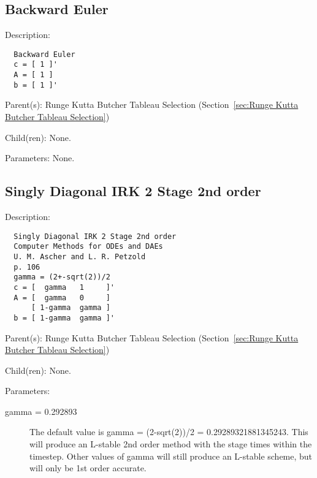 \subsection{Backward Euler}
\label{sec:Backward Euler-Runge Kutta Butcher Tableau Selection}

\begin{list}{}
  {\setlength{\leftmargin}{1.0in}
   \setlength{\labelwidth}{0.75in}
   \setlength{\labelsep}{0.125in}}
  \item[Description:]
\begin{verbatim}
  Backward Euler
  c = [ 1 ]'
  A = [ 1 ]
  b = [ 1 ]'
\end{verbatim}
  \item[Parent(s):]
    Runge Kutta Butcher Tableau Selection (Section~\ref{sec:Runge Kutta Butcher Tableau Selection})
  \item[Child(ren):]
    None. 
  \item[Parameters:]
    None. 
\end{list}

\subsection{Singly Diagonal IRK 2 Stage 2nd order}
\label{sec:Singly Diagonal IRK 2 Stage 2nd order}

\begin{list}{}
  {\setlength{\leftmargin}{1.0in}
   \setlength{\labelwidth}{0.75in}
   \setlength{\labelsep}{0.125in}}
  \item[Description:]
\begin{verbatim}
  Singly Diagonal IRK 2 Stage 2nd order
  Computer Methods for ODEs and DAEs
  U. M. Ascher and L. R. Petzold
  p. 106
  gamma = (2+-sqrt(2))/2
  c = [  gamma   1     ]'
  A = [  gamma   0     ]
      [ 1-gamma  gamma ]
  b = [ 1-gamma  gamma ]'
\end{verbatim}
  \item[Parent(s):]
    Runge Kutta Butcher Tableau Selection (Section~\ref{sec:Runge Kutta Butcher Tableau Selection})
  \item[Child(ren):]
    None. 
  \item[Parameters:]
    \begin{description}
      \item[gamma = 0.292893] 
The default value is gamma = (2-sqrt(2))/2 = 0.29289321881345243. This will produce an L-stable 2nd order method with the stage times within the timestep.  Other values of gamma will still produce an L-stable scheme, but will only be 1st order accurate.
\end{description}

\end{list}

